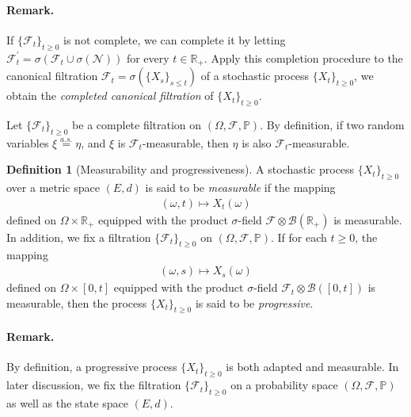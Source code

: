 \documentclass{article}
\numberwithin{equation}{section}
\renewcommand{\P}{\mathbb{P}}
\theoremstyle{plain}
\theoremstyle{definition}
\newtheorem{definition}[theorem]{Definition}
\begin{document}
\paragraph{Remark.} If $\{\mathscr{F}_t\}_{t\geq 0}$ is not complete, we can complete it by letting $\mathscr{F}_t^\prime=\sigma\left(\mathscr{F}_t\cup\sigma(\mathscr{N})\right)$ for every $t\in\mathbb{R}_+$. Apply this completion procedure to the canonical filtration $\mathscr{F}_t=\sigma\left(\{X_s\}_{s\leq t}\right)$ of a stochastic process $\{X_t\}_{t\geq 0}$, we obtain the \textit{completed canonical filtration} of $\{X_t\}_{t\geq 0}$.

Let $\{\mathscr{F}_t\}_{t\geq 0}$ be a complete filtration on $(\Omega,\mathscr{F},\P)$. By definition, if two random variables $\xi\overset{a.s.}{=}\eta$, and $\xi$ is $\mathscr{F}_t$-measurable, then $\eta$ is also $\mathscr{F}_t$-measurable.

\begin{definition}[Measurability and progressiveness]\label{def:3.8} A stochastic process $\{X_t\}_{t\geq 0}$ over a metric space $(E,d)$ is said to be \textit{measurable} if the mapping
\begin{align*}
	(\omega,t)\mapsto X_t(\omega)
\end{align*}
defined on $\Omega\times\mathbb{R}_+$ equipped with the product $\sigma$-field $\mathscr{F}\otimes\mathscr{B}(\mathbb{R}_+)$ is measurable. In addition, we fix a filtration $\{\mathscr{F}_t\}_{t\geq 0}$ on $(\Omega,\mathscr{F},\P)$. If for each $t\geq 0$, the mapping
\begin{align*}
	(\omega,s)\mapsto X_s(\omega)
\end{align*}
defined on $\Omega\times[0,t]$ equipped with the product $\sigma$-field $\mathscr{F}_t\otimes\mathscr{B}([0,t])$ is measurable, then the process $\{X_t\}_{t\geq 0}$ is said to be \textit{progressive}.
\end{definition}

\paragraph{Remark.} By definition, a progressive process $\{X_t\}_{t\geq 0}$ is both adapted and measurable. In later discussion, we fix the filtration $\{\mathscr{F}_t\}_{t\geq 0}$ on a probability space $(\Omega,\mathscr{F},\P)$ as well as the state space $(E,d)$.
\end{document}
